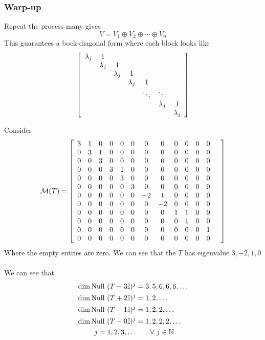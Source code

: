 \subsubsection*{Warp-up}
Repeat the process many gives 
\[V = V_1 \oplus V_2 \oplus \cdots \oplus V_n \]
This guarantees a bock-diagonal form where each block looks like 
\[ \left[ \begin{array}{ccccccccccccccccccccccccccccccccccccccccccccccccccccccccccc} 
\lambda_j & 1 \\	
& \lambda_j & 1 \\
&& \lambda_j & 1 \\
&&& \lambda_j & 1 \\
&&&& \ddots & \ddots \\
&&&&& \lambda_j & 1 \\
&&&&&& \lambda_j
\end{array} \right]\]


\begin{example}
	Consider
	\[ \mathcal M(T) =  \left[ \begin{array}{ccccccccccccccccccccccccccccccccccccccccccccccccccccccccccc} 
		3 & 1 & 0 & 0 & 0 & 0 & 0 & 0 & 0 & 0 & 0 & 0\\
		0 & 3 & 1 & 0 & 0 & 0 & 0 & 0 & 0 & 0 & 0 & 0\\
		0 & 0 & 3 & 0 & 0 & 0 & 0 & 0 & 0 & 0 & 0 & 0\\
		0 & 0 & 0 & 3 & 1 & 0 & 0 & 0 & 0 & 0 & 0 & 0\\
		0 & 0 & 0 & 0 & 3 & 0 & 0 & 0 & 0 & 0 & 0 & 0\\
		0 & 0 & 0 & 0 & 0 & 3 & 0 & 0 & 0 & 0 & 0 & 0  \\
		0 & 0 & 0 & 0 & 0 & 0 & -2 & 1 & 0 & 0 & 0 & 0 \\
		0 & 0 & 0 & 0 & 0 & 0 & 0 & -2 & 0 & 0 & 0 & 0 & \\
		0 & 0 & 0 & 0 & 0 & 0 & 0 & 0 & 1 & 1 & 0 & 0\\
		0 & 0 & 0 & 0 & 0 & 0 & 0 & 0 & 0 & 1 & 0 & 0\\
		0 & 0 & 0 & 0 & 0 & 0 & 0 & 0 & 0 & 0 & 0 & 1 \\
		0 & 0 & 0 & 0 & 0 & 0 & 0 & 0 & 0 & 0 & 0 & 0 \end{array} \right]\]
Where the empty entries are zero. We can see that the $T$ has eigenvalue $3,-2,1,0$. \\
We can see that \begin{align*} \dim \text{Null } (T - 3 \mathbb I)^j &= 3,5,6,6,6, \ldots \\
\dim \text{Null } (T + 2\mathbb I)^j &= 1,2, \ldots \\
\dim \text{Null } (T - 1 \mathbb I)^j &= 1,2,2,\ldots \\
\dim \text{Null } (T - 0 \mathbb I)^j &= 1,2,2,2, \ldots \\
j = 1,2,3, \ldots & \qquad \forall\ j \in \mathbb N
\end{align*}
\end{example}
